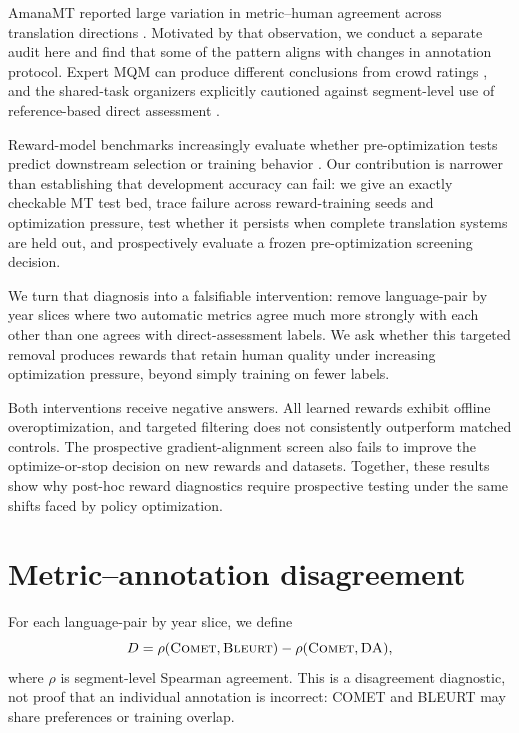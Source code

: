 \documentclass[11pt]{article}
\begin{document}
AmanaMT reported large variation in metric--human agreement across translation
directions \citep{thompson-2026-amanamt}.  Motivated by that observation, we
conduct a separate audit here and find that some of the pattern aligns with
changes in annotation protocol.  Expert MQM can
produce different conclusions from crowd ratings \citep{freitag-etal-2021-experts},
and the shared-task organizers explicitly cautioned against segment-level use
of reference-based direct assessment \citep{freitag-etal-2022-results}.

Reward-model benchmarks increasingly evaluate whether pre-optimization tests
predict downstream selection or training behavior
\citep{zhou-etal-2025-rmb,malik-etal-2025-rewardbench2,kim-etal-2025-rethinking}.
Our contribution is narrower than establishing that development accuracy can
fail: we give an exactly checkable MT test bed, trace failure across
reward-training seeds and optimization pressure, test whether it persists when
complete translation systems are held out, and prospectively evaluate a frozen
pre-optimization screening decision.

We turn that diagnosis into a falsifiable intervention: remove language-pair
by year slices where two automatic metrics agree much more strongly with each
other than one agrees with direct-assessment labels.  We ask whether this
targeted removal produces rewards that retain human quality under increasing
optimization pressure, beyond simply training on fewer labels.

Both interventions receive negative answers.  All learned rewards exhibit
offline overoptimization, and targeted filtering does not consistently
outperform matched controls.  The prospective gradient-alignment screen also
fails to improve the optimize-or-stop decision on new rewards and datasets.
Together, these results show why post-hoc reward diagnostics require prospective
testing under the same shifts faced by policy optimization.

\section{Metric--annotation disagreement}

For each language-pair by year slice, we define
\begin{equation}
D = \rho(\textsc{Comet},\textsc{Bleurt})
  - \rho(\textsc{Comet},\textsc{DA}),
\end{equation}
where $\rho$ is segment-level Spearman agreement.  This is a disagreement
diagnostic, not proof that an individual annotation is incorrect: COMET and
BLEURT may share preferences or training overlap.
\end{document}
